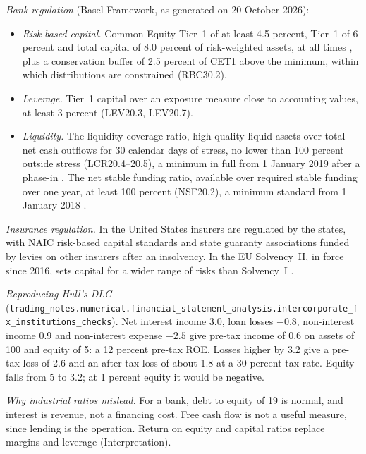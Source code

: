 \begin{qfdefinition}
\emph{Bank regulation} (Basel Framework, as generated on 20 October 2026):
\begin{itemize}
\item \emph{Risk-based capital.} Common Equity Tier~1 of at least 4.5 percent, Tier~1 of 6 percent and total capital of 8.0 percent of risk-weighted assets, at all times \citep[RBC20.1]{basel-framework-2026}, plus a conservation buffer of 2.5 percent of CET1 above the minimum, within which distributions are constrained (RBC30.2).
\item \emph{Leverage.} Tier~1 capital over an exposure measure close to accounting values, at least 3 percent (LEV20.3, LEV20.7).
\item \emph{Liquidity.} The liquidity coverage ratio, high-quality liquid assets over total net cash outflows for 30 calendar days of stress, no lower than 100 percent outside stress (LCR20.4--20.5), a minimum in full from 1 January 2019 after a phase-in \citep[LCR90.1]{basel-framework-ccr-mar-2026}. The net stable funding ratio, available over required stable funding over one year, at least 100 percent (NSF20.2), a minimum standard from 1 January 2018 \citep[para.~8]{bcbs-nsfr-2014}.
\end{itemize}

\emph{Insurance regulation.} In the United States insurers are regulated by the states, with NAIC risk-based capital standards and state guaranty associations funded by levies on other insurers after an insolvency. In the EU Solvency~II, in force since 2016, sets capital for a wider range of risks than Solvency~I \citep[pp.~65--66]{risk-management-financial-institutions-2023}.

 \emph{Reproducing Hull's DLC} (\nolinkurl{trading_notes.numerical.financial_statement_analysis.intercorporate_fx_institutions_checks}). Net interest income 3.0, loan losses $-0.8$, non-interest income 0.9 and non-interest expense $-2.5$ give pre-tax income of 0.6 on assets of 100 and equity of 5: a 12 percent pre-tax ROE. Losses higher by 3.2 give a pre-tax loss of 2.6 and an after-tax loss of about 1.8 at a 30 percent tax rate. Equity falls from 5 to 3.2; at 1 percent equity it would be negative.

\emph{Why industrial ratios mislead.} For a bank, debt to equity of 19 is normal, and interest is revenue, not a financing cost. Free cash flow is not a useful measure, since lending is the operation. Return on equity and capital ratios replace margins and leverage (Interpretation).


\end{qfdefinition}
